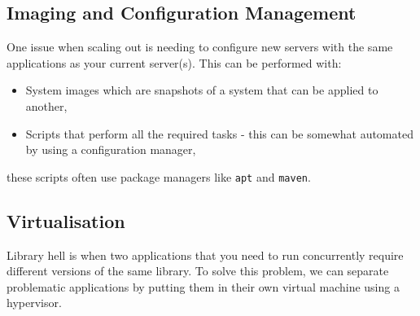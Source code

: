 \subsection{Imaging and Configuration Management}

One issue when scaling out is needing to configure new servers with the same
applications as your current server(s). This can be performed with: \begin{itemize}
    \item System images which are snapshots of a system that can be applied
    to another,
    \item Scripts that perform all the required tasks - this can be somewhat
    automated by using a configuration manager,
\end{itemize} these scripts often use package managers like \texttt{apt} and 
\texttt{maven}.

\subsection{Virtualisation}

Library hell is when two applications that you need to run concurrently require
different versions of the same library. To solve this problem, we can separate
problematic applications by putting them in their own virtual machine using
a hypervisor.


